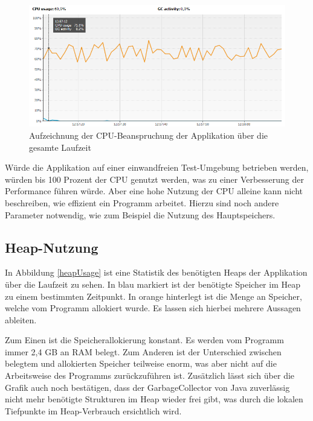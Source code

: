 \begin{figure}[h]
	\centering
	\includegraphics[width=0.9\linewidth]{images/cpuUsage.png}
	\caption{Aufzeichnung der CPU-Beanspruchung der Applikation über die gesamte Laufzeit}
	\label{cpuUsage}
\end{figure}

Würde die Applikation auf einer einwandfreien Test-Umgebung betrieben werden, würden bis 100 Prozent der CPU genutzt werden, was zu einer Verbesserung der Performance führen würde. Aber eine hohe Nutzung der CPU alleine kann nicht beschreiben, wie effizient ein Programm arbeitet. Hierzu sind noch andere Parameter notwendig, wie zum Beispiel die Nutzung des Hauptspeichers.

\subsection{Heap-Nutzung}
In Abbildung \ref{heapUsage} ist eine Statistik des benötigten Heaps der Applikation über die Laufzeit zu sehen. In blau markiert ist der benötigte Speicher im Heap zu einem bestimmten Zeitpunkt. In orange hinterlegt ist die Menge an Speicher, welche vom Programm allokiert wurde. Es lassen sich hierbei mehrere Aussagen ableiten. 

Zum Einen ist die Speicherallokierung konstant. Es werden vom Programm immer 2,4 GB an RAM belegt. Zum Anderen ist der Unterschied zwischen belegtem und allokierten Speicher teilweise enorm, was aber nicht auf die Arbeitsweise des Programms zurückzuführen ist. Zusätzlich lässt sich über die Grafik auch noch bestätigen, dass der GarbageCollector von Java zuverlässig nicht mehr benötigte Strukturen im Heap wieder frei gibt, was durch die lokalen Tiefpunkte im Heap-Verbrauch ersichtlich wird.

